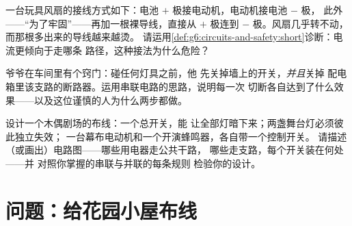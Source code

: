 \begin{exercise}[$\star\star$]\label{exo:g6:circuits-and-safety:10}
一台玩具风扇的接线方式如下：电池 $+$ 极接电动机，电动机接电池 $-$ 极，
此外——“为了牢固”——再加一根裸导线，直接从
$+$ 极连到 $-$ 极。风扇几乎转不动，而那根多出来的导线越来越烫。
请运用\cref{def:g6:circuits-and-safety:short}诊断：电流更倾向于走哪条
路径，这种接法为什么危险？
\end{exercise}

\begin{exercise}[$\star\star$]\label{exo:g6:circuits-and-safety:11}
爷爷在车间里有个窍门：碰任何灯具之前，他
先关掉墙上的开关，\emph{并且}关掉
配电箱里该支路的断路器。运用串联电路的思路，说明每一次
切断各自达到了什么效果——以及这位谨慎的人为什么两步都做。
\end{exercise}

\begin{exercise}[$\star\star\star$]\label{exo:g6:circuits-and-safety:12}
设计一个木偶剧场的布线：一个总开关，能
让全部灯暗下来；两盏舞台灯必须彼此独立失效；
一台幕布电动机和一个开演蜂鸣器，各自带一个控制开关。
请描述（或画出）电路图——哪些用电器走公共干路，
哪些走支路，每个开关装在何处——并
对照你掌握的串联与并联的每条规则
检验你的设计。
\end{exercise}

\section{问题：给花园小屋布线}


